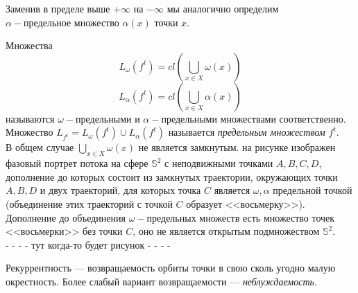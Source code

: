 
\noindent Заменив в пределе выше \(+\infty\) на \(-\infty\) мы аналогично определим \textit{\(\alpha - \text{предельное множество}\)} \(\alpha(x)\) точки \(x\).


\noindent Множества
\[
    L_{\omega }(f^t) = cl(\bigcup_{x \in X} \omega (x))\]
\[
    L_{\alpha  }(f^t) = cl(\bigcup_{x \in X} \alpha  (x))\] 
называются \textit{\(\omega - \text{предельными}\)} и \textit{\(\alpha - \text{предельными}\)} множествами соответственно. 
\\[1mm]
Множество \(L_{f^t} = L_{\omega }(f^t)\cup L_{\alpha }(f^t)\) называется \textit{предельным множеством \(f^t\)}. 
\\[2mm]
В общем случае \(\bigcup_{x \in X} \omega (x)\) не является замкнутым. на рисунке изображен фазовый портрет потока 
на сфере \(\mathbb{S}^2\) с неподвижными точками \(A, B, C, D\), дополнение до которых состоит из замкнутых 
траектории, окружающих точки \(A, B, D\) и двух траекторий, для которых точка \(C\) является \(\omega, \alpha \)
предельной точкой (объединение этих траекторий с точкой \(C\) образует <<восьмерку>>). Дополнение до объединения \(\omega - \text{предельных}\) 
множеств есть множество точек <<восьмерки>> без точки \(C\), оно не является открытым подмножеством \(\mathbb{S}^2\). 
\\[1mm]
- - - - тут когда-то будет рисунок - - - -

\noindent Рекуррентность --- возвращаемость орбиты точки в свою сколь угодно малую окрестность. Более слабый вариант возвращаемости --- \textit{неблуждаемость}. 

